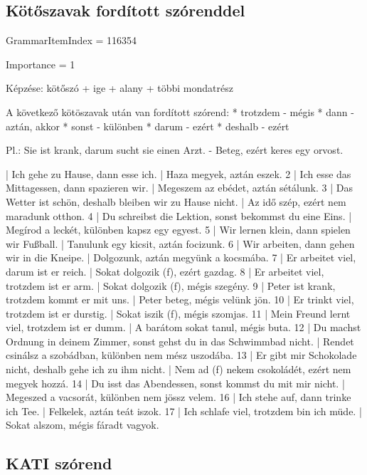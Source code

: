 \documentclass{article}
\newenvironment{desc}{\verbatim}{\endverbatim}
\newenvironment{exmp}{\verbatim}{\endverbatim}
\begin{document}
\subsection{Kötőszavak fordított szórenddel}

GrammarItemIndex = 116354

Importance = 1

\begin{desc}
Képzése: kötőszó + ige + alany + többi mondatrész

A következő kötöszavak után van fordított szórend:
* trotzdem - mégis
* dann - aztán, akkor
* sonst - különben
* darum - ezért
* deshalb - ezért

Pl.: Sie ist krank, darum sucht sie einen Arzt. - Beteg, ezért keres egy orvost.
\end{desc}

\begin{exmp}
1 | Ich gehe zu Hause, dann esse ich. | Haza megyek, aztán eszek.
2 | Ich esse das Mittagessen, dann spazieren wir. | Megeszem az ebédet, aztán sétálunk.
3 | Das Wetter ist schön, deshalb bleiben wir zu Hause nicht. | Az idő szép, ezért nem maradunk otthon.
4 | Du schreibst die Lektion, sonst bekommst du eine Eins. | Megírod a leckét, különben kapsz egy egyest.
5 | Wir lernen klein, dann spielen wir Fußball. | Tanulunk egy kicsit, aztán focizunk.
6 | Wir arbeiten, dann gehen wir in die Kneipe. | Dolgozunk, aztán megyünk a kocsmába.
7 | Er arbeitet viel, darum ist er reich. | Sokat dolgozik (f), ezért gazdag.
8 | Er arbeitet viel, trotzdem ist er arm. | Sokat dolgozik (f), mégis szegény.
9 | Peter ist krank, trotzdem kommt er mit uns. | Peter beteg, mégis velünk jön.
10 | Er trinkt viel, trotzdem ist er durstig. | Sokat iszik (f), mégis szomjas.
11 | Mein Freund lernt viel, trotzdem ist er dumm. | A barátom sokat tanul, mégis buta.
12 | Du machst Ordnung in deinem Zimmer, sonst gehst du in das Schwimmbad nicht. | Rendet csinálsz a szobádban, különben nem mész uszodába.
13 | Er gibt mir Schokolade nicht, deshalb gehe ich zu ihm nicht. | Nem ad (f) nekem csokoládét, ezért nem megyek hozzá.
14 | Du isst das Abendessen, sonst kommst du mit mir nicht. | Megeszed a vacsorát, különben nem jössz velem.
16 | Ich stehe auf, dann trinke ich Tee. | Felkelek, aztán teát iszok.
17 | Ich schlafe viel, trotzdem bin ich müde. | Sokat alszom, mégis fáradt vagyok.
\end{exmp}

\subsection{KATI szórend}
\end{document}
